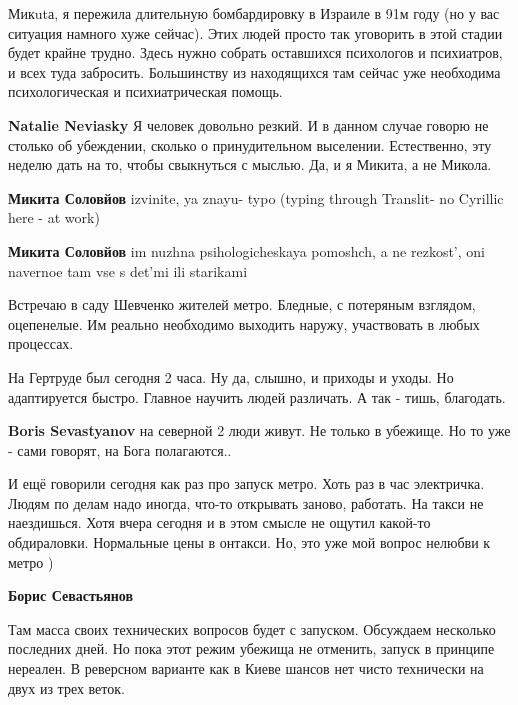 \begin{itemize}
Микutа, я пережила длительную бомбардировку в Израиле в 91м году (но у вас
ситуация намного хуже сейчас). Этих людей просто так уговорить в этой стадии
будет крайне трудно. Здесь нужно собрать оставшихся психологов и психиатров, и
всех туда забросить. Большинству из находящихся там сейчас уже необходима
психологическая и психиатрическая помощь.

\begin{itemize} %
\textbf{Natalie Neviasky} Я человек довольно резкий. И в данном случае говорю не столько об убеждении, сколько о принудительном выселении. Естественно, эту неделю дать на то, чтобы свыкнуться с мыслью.
Да, и я Микита, а не Микола.

\textbf{Микита Соловйов} izvinite, ya znayu- typo (typing through Translit- no Cyrillic here - at work)

\textbf{Микита Соловйов} im nuzhna psihologicheskaya pomoshch, a ne rezkost', oni navernoe tam vse s det'mi ili starikami
\end{itemize} %


Встречаю в саду Шевченко жителей метро. Бледные, с потеряным
взглядом, оцепенелые. Им реально необходимо выходить наружу, участвовать в любых
процессах.


На Гертруде был сегодня 2 часа. Ну да, слышно, и приходы и уходы. Но
адаптируется быстро. Главное научить людей различать. А так - тишь, благодать.

\textbf{Boris Sevastyanov} на северной 2 люди живут. Не только в убежище. Но то уже - сами говорят, на Бога полагаются..


И ещё говорили сегодня как раз про запуск метро. Хоть раз в час электричка.
Людям по делам надо иногда, что-то открывать заново, работать. На такси не
наездишься. Хотя вчера сегодня и в этом смысле не ощутил какой-то обдираловки.
Нормальные цены в онтакси. Но, это уже мой вопрос нелюбви к метро )

\textbf{Борис Севастьянов} 

Там масса своих технических вопросов будет с запуском. Обсуждаем несколько
последних дней. Но пока этот режим убежища не отменить, запуск в принципе
нереален. В реверсном варианте как в Киеве шансов нет чисто технически на двух
из трех веток.


\end{itemize}
